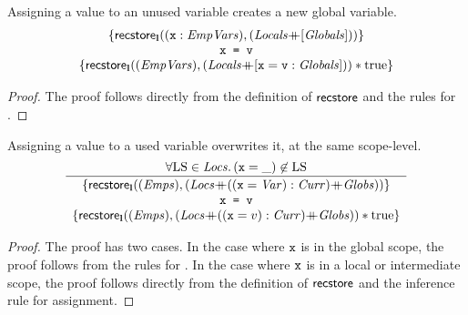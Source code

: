 \documentclass{article}
\begin{document}
\begin{lemma}
        Assigning a value to an unused variable creates a new global variable.
        \[\begin{array}{c}
                \{ \mathsf{recstore}_{\textbf{l}}((\mbox{\texttt{{\upshape x}}}:{\mathit{EmpVars}}) , ({\mathit{Locals}}{\mathbin{+\mkern-10mu+}}[{\mathit{Globals}}])) \} \\
                \mbox{\texttt{{\upshape x = v}}}\\
                \{ \mathsf{recstore}_{\textbf{l}}(({\mathit{EmpVars}}) , ({\mathit{Locals}}{\mathbin{+\mkern-10mu+}}[\mbox{\texttt{{\upshape x}}}=\mbox{\texttt{{\upshape v}}}:{\mathit{Globals}}])) \mathbin{*} {\mathrm{true}} \} \\
        \end{array}\]
        \begin{proof}
                The proof follows directly from the definition of $\mathsf{recstore}$ and the rules for \store.
        \end{proof}
\end{lemma}

\begin{lemma}
        Assigning a value to a used variable overwrites it, at the same scope-level.
        \[\frac{
        \forall \V{LS} \elem \E{Locs} \st (\js{x}=\_)\not\elem\V{LS}
        }{\begin{array}{c}
                \{ \recstore_{\ls}((\E{Emps}) , (\E{Locs}{\append}((\js{x}=\E{Var}):\E{Curr}){\append}\E{Globs})) \} \\
                \js{x = v}\\
                \{ \recstore_{\ls}((\E{Emps}) , (\E{Locs}{\append}((\js{x}=v):\E{Curr}){\append}\E{Globs})) \sep \true \} \\
        \end{array}}\]
        \begin{proof}
                The proof has two cases. In the case where $\mbox{\texttt{{\upshape x}}}$ is in the global scope, the proof follows from the rules for \store.
                In the case where $\mbox{\texttt{{\upshape x}}}$ is in a local or intermediate scope, the proof follows directly from the definition of $\mathsf{recstore}$ and the inference rule for assignment.
        \end{proof}
\end{lemma}
\end{document}

